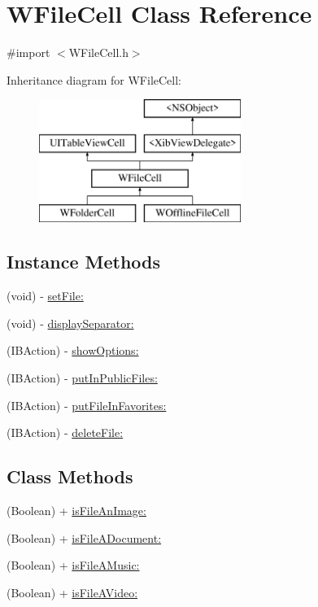 \hypertarget{interface_w_file_cell}{\section{W\-File\-Cell Class Reference}
\label{interface_w_file_cell}
}


{\ttfamily \#import $<$W\-File\-Cell.\-h$>$}

Inheritance diagram for W\-File\-Cell\-:\begin{figure}[H]
\begin{center}
\leavevmode
\includegraphics[height=4.000000cm]{interface_w_file_cell}
\end{center}
\end{figure}
\subsection*{Instance Methods}
\begin{DoxyCompactItemize}
\item 
(void) -\/ \hyperlink{interface_w_file_cell_afc96c7221a3f20b3b8c4712b1ef7f3a7}{set\-File\-:}
\item 
(void) -\/ \hyperlink{interface_w_file_cell_a71970c6faa4edaa4c216cdf15d9d4d5e}{display\-Separator\-:}
\item 
(I\-B\-Action) -\/ \hyperlink{interface_w_file_cell_a50567211130e767e158f371803e88d26}{show\-Options\-:}
\item 
(I\-B\-Action) -\/ \hyperlink{interface_w_file_cell_a25665ea226b5cf9c7f0ed7c68cd5d67c}{put\-In\-Public\-Files\-:}
\item 
(I\-B\-Action) -\/ \hyperlink{interface_w_file_cell_a2c052a47b16099f9d5c27f830e47fb01}{put\-File\-In\-Favorites\-:}
\item 
(I\-B\-Action) -\/ \hyperlink{interface_w_file_cell_aa2e95457523f97a05fd75a970167d8a2}{delete\-File\-:}
\end{DoxyCompactItemize}
\subsection*{Class Methods}
\begin{DoxyCompactItemize}
\item 
(Boolean) + \hyperlink{interface_w_file_cell_a80fe9d850d25cd700d387e187cc39913}{is\-File\-An\-Image\-:}
\item 
(Boolean) + \hyperlink{interface_w_file_cell_a392ce5bd23ad8b68a7029d426ba458de}{is\-File\-A\-Document\-:}
\item 
(Boolean) + \hyperlink{interface_w_file_cell_a63cfa5e46ef5475ec9151bb9e5864330}{is\-File\-A\-Music\-:}
\item 
(Boolean) + \hyperlink{interface_w_file_cell_ad5f0542928e53032f03e5dd7cad2873d}{is\-File\-A\-Video\-:}
\end{DoxyCompactItemize}
